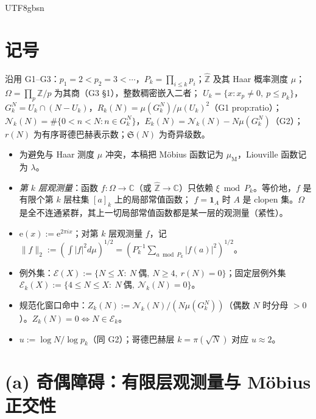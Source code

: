 \documentclass[11pt,a4paper]{article}
\newcommand{\Zhat}{\widehat{\mathbb Z}}
\newcommand{\Haar}{\mu}
\newcommand{\Sing}{\mathfrak S}
\newcommand{\Cnt}{\mathcal N}          %
\newcommand{\Om}{\Omega}               %
\newcommand{\cyl}[2]{[#1]_{#2}}        %
\newcommand{\Mob}{\mu_{\mathrm{M}}}    %
\newcommand{\Liou}{\lambda}            %
\newcommand{\ee}{\mathrm e}
\newcommand{\Exc}{\mathcal E}          %
\theoremstyle{plain}
\theoremstyle{definition}
\begin{document}
\begin{CJK}{UTF8}{gbsn}
\section{记号}\label{g4:sec:notation}

沿用 G1--G3：$p_1=2<p_2=3<\cdots$，$P_k=\prod_{i\le k}p_i$；$\Zhat$ 及其 Haar 概率测度 $\Haar$；$\Om=\prod_p\mathbb Z/p$ 为其商（G3 \S1），整数稠密嵌入二者；
$U_k=\{x:x_p\ne0,\ p\le p_k\}$，$G_k^N=U_k\cap(N-U_k)$，$R_k(N)=\Haar(G_k^N)/\Haar(U_k)^2$（G1 prop:ratio）；
$\Cnt_k(N)=\#\{0<n<N:n\in G_k^N\}$，$E_k(N)=\Cnt_k(N)-N\Haar(G_k^N)$（G2）；$r(N)$ 为有序哥德巴赫表示数；$\Sing(N)$ 为奇异级数。
\begin{itemize}[leftmargin=*]
\item 为避免与 Haar 测度 $\Haar$ 冲突，本稿把 M\"obius 函数记为 $\Mob$，Liouville 函数记为 $\Liou$。
\item \emph{第 $k$ 层观测量}：函数 $f:\Om\to\mathbb C$（或 $\Zhat\to\mathbb C$）只依赖 $\xi\bmod P_k$。等价地，$f$ 是有限个第 $k$ 层柱集 $\cyl ak$ 上的局部常值函数；
$f=\mathbf 1_A$ 时 $A$ 是 clopen 集。$\Om$ 是全不连通紧群，其上一切局部常值函数都是某一层的观测量（紧性）。
\item $\ee(x):=\ee^{2\pi ix}$；对第 $k$ 层观测量 $f$，记 $\|f\|_2:=(\int|f|^2d\Haar)^{1/2}=(P_k^{-1}\sum_{a\bmod P_k}|f(a)|^2)^{1/2}$。
\item 例外集：$\Exc(X):=\{N\le X:\ N\ \text{偶},\ N\ge4,\ r(N)=0\}$；固定层例外集 $\Exc_k(X):=\{4\le N\le X:\ N\ \text{偶},\ \Cnt_k(N)=0\}$。
\item 规范化窗口命中：$Z_k(N):=\Cnt_k(N)/(N\Haar(G_k^N))$（偶数 $N$ 时分母 $>0$）。$Z_k(N)=0\iff N\in\Exc_k$。
\item $u:=\log N/\log p_k$（同 G2）；哥德巴赫层 $k=\pi(\sqrt N)$ 对应 $u\approx2$。
\end{itemize}

\section{(a) 奇偶障碍：有限层观测量与 M\"obius 正交性}\label{g4:sec:parity}


\end{CJK}
\end{document}
